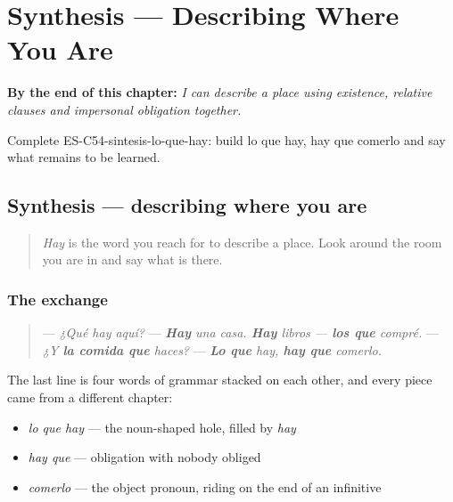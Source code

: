 
\chapter{Synthesis --- Describing Where You Are}
\label{ch:synthesis-hay}

\begin{chapteropening}
\textbf{By the end of this chapter:} \emph{I can describe a place using existence, relative clauses and impersonal obligation together.}

Complete ES-C54-sintesis-lo-que-hay: build lo que hay, hay que comerlo and say what remains to be learned.
\end{chapteropening}

\section[Practice]{Synthesis — describing where you are}

\label{lesson:ES-C54-sintesis-lo-que-hay}



\begin{quote}
\emph{Hay} is the word you reach for to describe a place. Look around the room you are in and say what is there.
\end{quote}

\subsection*{The exchange}
\begin{quote}
— \emph{¿Qué hay aquí?} — \emph{\textbf{Hay} una casa. \textbf{Hay} libros — \textbf{los que} compré.} — \emph{¿Y \textbf{la comida que} haces?} — \emph{\textbf{Lo que} hay, \textbf{hay que} comerlo.}
\end{quote}

The last line is four words of grammar stacked on each other, and every piece came from a different chapter:

\begin{itemize}
\raggedright
  \item \emph{lo que hay} — the noun-shaped hole, filled by \emph{hay}
  \item \emph{hay que} — obligation with nobody obliged
  \item \emph{comerlo} — the object pronoun, riding on the end of an infinitive
\end{itemize}

